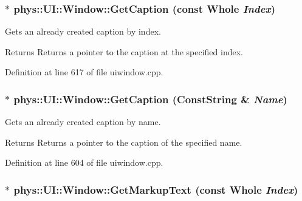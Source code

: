 \hypertarget{classphys_1_1UI_1_1Window_acfd87d8fa929b8a25d968f04d3e05aca}{
\subsubsection[{GetCaption}]{ $\ast$ phys::UI::Window::GetCaption (const {\bf Whole} {\em Index})}}
\label{d4/d86/classphys_1_1UI_1_1Window_acfd87d8fa929b8a25d968f04d3e05aca}


Gets an already created caption by index. 

\begin{DoxyReturn}{Returns}
Returns a pointer to the caption at the specified index. 
\end{DoxyReturn}


Definition at line 617 of file uiwindow.cpp.

\hypertarget{classphys_1_1UI_1_1Window_acfc2669ecac2824bfa7cc53eb724d191}{
\subsubsection[{GetCaption}]{ $\ast$ phys::UI::Window::GetCaption ({\bf ConstString} \& {\em Name})}}
\label{d4/d86/classphys_1_1UI_1_1Window_acfc2669ecac2824bfa7cc53eb724d191}


Gets an already created caption by name. 

\begin{DoxyReturn}{Returns}
Returns a pointer to the caption of the specified name. 
\end{DoxyReturn}


Definition at line 604 of file uiwindow.cpp.

\hypertarget{classphys_1_1UI_1_1Window_a90e9c02fe3374e386495e95965e25158}{
\subsubsection[{GetMarkupText}]{ $\ast$ phys::UI::Window::GetMarkupText (const {\bf Whole} {\em Index})}}
\label{d4/d86/classphys_1_1UI_1_1Window_a90e9c02fe3374e386495e95965e25158}


